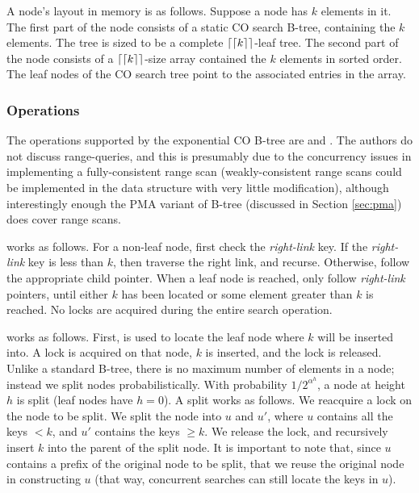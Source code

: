 \documentclass{style}
\begin{document}
A node's layout in memory is as follows. Suppose a node has $k$
elements in it. The first part of the node consists of a static
CO search B-tree, containing the $k$ elements. The tree is sized
to be a complete $\lceil\lceil k \rceil\rceil$-leaf tree. The second
part of the node consists of a $\lceil\lceil k \rceil\rceil$-size array
contained the $k$ elements in sorted order. The leaf nodes of the
CO search tree point to the associated entries in the array.

\subsubsection{Operations}
The operations supported by the exponential CO B-tree are \Search{}
and \Insert{}. The authors do not discuss range-queries, and this
is presumably due to the concurrency issues in implementing a fully-consistent
range scan (weakly-consistent range scans could be implemented in the data
structure with very little modification), although interestingly enough
the PMA variant of B-tree (discussed in Section \ref{sec:pma}) does
cover range scans. 

\Search{} works as follows. For a non-leaf node, first check the
\textit{right-link} key. If the \textit{right-link} key is less than
$k$, then traverse the right link, and recurse. Otherwise, follow
the appropriate child pointer. When a leaf node is reached, only
follow \textit{right-link} pointers, until either $k$ has been located
or some element greater than $k$ is reached. No locks are acquired
during the entire search operation.

\Insert{} works as follows. First, \Search{} is used to locate the leaf node
where $k$ will be inserted into. A lock is acquired on that node, $k$ is
inserted, and the lock is released. Unlike a standard B-tree, there is no
maximum number of elements in a node; instead we split nodes probabilistically.
With probability ${1}/{2^{\alpha^h}}$, a node at height $h$ is split (leaf
nodes have $h = 0$). A split works as follows.  We reacquire a lock on the node
to be split. We split the node into $u$ and $u'$, where $u$ contains all the
keys $< k$, and $u'$ contains the keys $\geq k$. We release the lock, and
recursively insert $k$ into the parent of the split node. It is important
to note that, since $u$ contains a prefix of the original node to be split,
that we reuse the original node in constructing $u$ (that way, concurrent
searches can still locate the keys in $u$).

\end{document}
